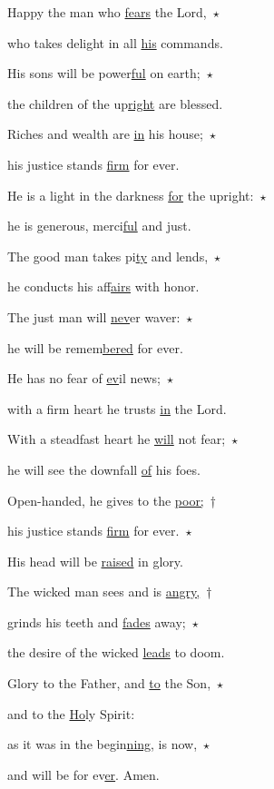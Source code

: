 \noindent Happy the man who \uline{fears} the Lord,~$\star$~\nopagebreak

who takes delight in all \uline{his} commands.

\noindent His sons will be power\uline{ful} on earth;~$\star$~\nopagebreak

the children of the up\uline{right} are blessed.

\noindent Riches and wealth are \uline{in} his house;~$\star$~\nopagebreak

his justice stands \uline{firm} for ever.

\noindent He is a light in the darkness \uline{for} the upright:~$\star$~\nopagebreak

he is generous, merci\uline{ful} and just.

\noindent The good man takes pi\uline{ty} and lends,~$\star$~\nopagebreak

he conducts his af\uline{fairs} with honor.

\noindent The just man will \uline{nev}er waver:~$\star$~\nopagebreak

he will be remem\uline{bered} for ever.

\noindent He has no fear of \uline{ev}il news;~$\star$~\nopagebreak

with a firm heart he trusts \uline{in} the Lord.

\noindent With a steadfast heart he \uline{will} not fear;~$\star$~\nopagebreak

he will see the downfall \uline{of} his foes.

\noindent Open-handed, he gives to the \uline{poor;}~†~\nopagebreak

his justice stands \uline{firm} for ever.~$\star$~\nopagebreak

His head will be \uline{raised} in glory.

\noindent The wicked man sees and is \uline{angry,}~†~\nopagebreak

grinds his teeth and \uline{fades} away;~$\star$~\nopagebreak

the desire of the wicked \uline{leads} to doom.

\noindent Glory to the Father, and \uline{to} the Son,~$\star$~\nopagebreak

and to the \uline{Ho}ly Spirit:

\noindent as it was in the begin\uline{ning}, is now,~$\star$~\nopagebreak

and will be for ev\uline{er}. Amen.
